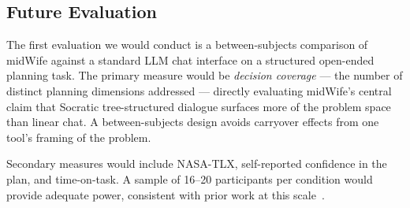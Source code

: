 \documentclass[sigconf]{acmart}
\begin{document}
\subsection{Future Evaluation}
The first evaluation we would conduct is a between-subjects comparison of midWife
against a standard LLM chat interface on a structured open-ended planning task.
The primary measure would be \textit{decision coverage} --- the number of distinct
planning dimensions addressed --- directly evaluating midWife's central claim that 
Socratic tree-structured dialogue surfaces more of the problem space than linear chat. 
A between-subjects design avoids carryover effects from one tool's framing of the problem.

Secondary measures would include NASA-TLX, self-reported confidence in the plan, and
time-on-task. A sample of 16--20 participants per condition would provide adequate
power, consistent with prior work at this scale~\cite{suh2023sensecape, suh2024luminate}.

\end{document}
